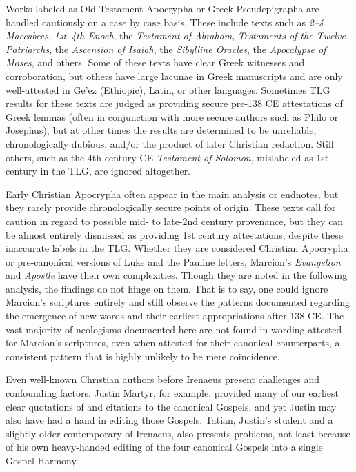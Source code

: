 Works labeled as Old Testament Apocrypha or Greek Pseudepigrapha %
are handled cautiously on a case by case basis. %
These include texts such as \textit{2--4 Maccabees}, \textit{1st--4th Enoch}, %
the \textit{Testament of Abraham}, %
\textit{Testaments of the Twelve Patriarchs}, the \textit{Ascension of Isaiah}, %
the \textit{Sibylline Oracles}, the \textit{Apocalypse of Moses}, and others. %
Some of these texts have clear Greek witnesses and corroboration, %
but others have large lacunae in Greek manuscripts and are only well-attested in Ge'ez (Ethiopic), %
Latin, or other languages. %
Sometimes TLG results for these texts are judged as providing secure pre-138 CE attestations %
of Greek lemmas (often in conjunction with more secure authors such as Philo or Josephus), %
but at other times the results are determined to be unreliable, chronologically dubious, %
and/or the product of later Christian redaction. %
Still others, such as the 4th century CE \textit{Testament of Solomon}, %
mislabeled as 1st century in the TLG, are ignored altogether.%

Early Christian Apocrypha often appear in the main analysis or endnotes, %
but they rarely provide chronologically secure points of origin. %
These texts call for caution in regard to possible mid- to late-2nd century provenance, %
but they can be almost entirely dismissed as providing 1st century attestations, %
despite these inaccurate labels in the TLG. %
Whether they are considered Christian Apocrypha or pre-canonical versions of Luke and the Pauline letters, %
Marcion's \textit{Evangelion} and \textit{Apostle} have their own complexities. %
Though they are noted in the following analysis, the findings do not hinge on them. %
That is to say, one could ignore Marcion's scriptures entirely and still observe the patterns documented %
regarding the emergence of new words and their earliest appropriations after 138 CE. %
The vast majority of neologisms documented here are not found in wording attested for Marcion's scriptures, %
even when attested for their canonical counterparts, %
a consistent pattern that is highly unlikely to be mere coincidence. %

Even well-known Christian authors before Irenaeus present %
challenges and confounding factors. %
Justin Martyr, for example, %
provided many of our earliest clear quotations of and citations to the canonical Gospels, %
and yet Justin may also have had a hand in editing those Gospels. %
Tatian, Justin's student and a slightly older contemporary of Irenaeus, %
also presents problems, not least because of his own heavy-handed editing %
of the four canonical Gospels into a single Gospel Harmony. %

